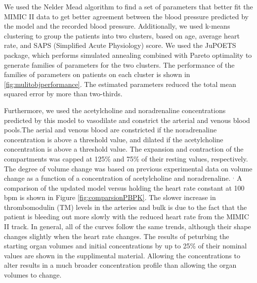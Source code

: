 \documentclass[12pt]{article}
\begin{document}
 We used the Nelder Mead algorithm to find a set of parameters that better fit the MIMIC II data to get better agreement between the blood pressure predicted by the model and the recorded blood pressure. Additionally, we used k-means clustering to group the patients into two clusters, based on age, average heart rate, and SAPS (Simplified Acute Physiology) score. We used the JuPOETS package, which performs simulated annealing combined with Pareto optimality to generate families of parameters for the two clusters. \cite{bassen2016jupoets} The performance of the families of parameters on patients on each cluster is shown in \ref{fig:mulitobjperformance}. The estimated parameters reduced the total mean squared error by more than two-thirds. 
 
Furthermore, we used the acetylcholine and noradrenaline concentrations predicted by this model to vasodilate and constrict the arterial and venous blood pools.The aerial and venous blood are constricted if the noradrenaline concentration is above a threshold value, and dilated if the acetylcholine concentration is above a threshold value. The expansion and contraction of the compartments was capped at 125\% and 75\% of their resting values, respectively. The degree of volume change was based on previous experimental data on volume change as a function of a concentration of acetylcholine and noradrenaline.\cite{chowienczyk1994blood} $^,$ \cite{dora1983effect} A comparison of the updated model versus holding the heart rate constant at 100 bpm is shown in Figure \ref{fig:comparsionPBPK}. The slower increase in thrombomodulin (TM) levels in the arteries and bulk is due to the fact that the patient is bleeding out more slowly with the reduced heart rate from the MIMIC II track. In general, all of the curves follow the same trends, although their shape changes slightly when the heart rate changes. The results of peturbing the starting organ volumes and initial concentrations by up to 25\% of their nominal values are shown in the supplimental material. Allowing the concentrations to alter results in a much broader concentration profile than allowing the organ volumes to change.
\end{document}
